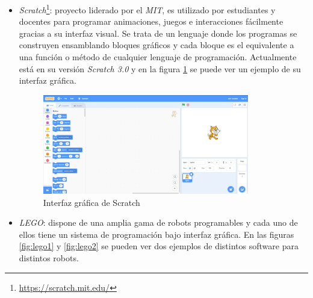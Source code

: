 \begin{itemize}
    \item \textit{Scratch}\footnote{\url{https://scratch.mit.edu/}}: proyecto liderado por el \textit{MIT}, es utilizado por estudiantes y docentes para programar animaciones, juegos e interacciones fácilmente gracias a su interfaz visual. Se trata de un lenguaje donde los programas se construyen ensamblando bloques gráficos y cada bloque es el equivalente a una función o método de cualquier lenguaje de programación. Actualmente está en su versión \textit{Scratch 3.0} y en la figura \ref{fig:scratch} se puede ver un ejemplo de su interfaz gráfica. 
    \begin{figure}[H]
    \centering
    \includegraphics[width=0.85\textwidth]{img/scratch.jpg}
    \caption{Interfaz gráfica de Scratch} \label{fig:scratch}
    \end{figure}

    \item \textit{LEGO}: dispone de una amplia gama de robots programables y cada uno de ellos tiene un sistema de programación bajo interfaz gráfica. En las figuras \ref{fig:lego1} y \ref{fig:lego2} se pueden ver dos ejemplos de distintos software para distintos robots.  
    

\end{itemize}
